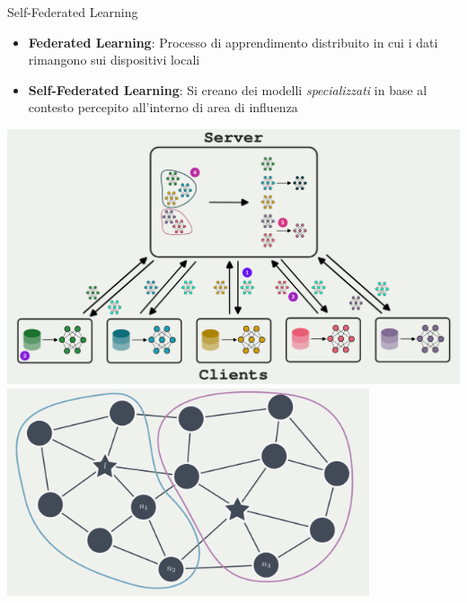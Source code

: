 \documentclass[presentation, 10pt,aspectratio=169]{beamer}\mode<presentation>{\usetheme{AMSBolognaFC}}
\begin{document}
\begin{frame}{Self-Federated Learning}
\begin{minipage}{0.4\textwidth}
	\begin{itemize}
		\item \textbf{Federated Learning}: Processo di apprendimento distribuito in cui i dati rimangono sui dispositivi locali
		\item \textbf{Self-Federated Learning}: Si creano dei modelli \emph{specializzati} in base al contesto percepito all'interno di \alert{area di influenza}
	\end{itemize}
\end{minipage}
\begin{minipage}{0.5\textwidth}
\centering
\includegraphics[width=\textwidth]{img/cluster-federated.png}
\includegraphics[width=0.8\textwidth]{img/field-informed.png}
\end{minipage}
\end{frame}
\end{document}
